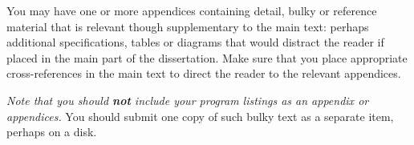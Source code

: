 You may have one or more appendices containing detail, bulky or reference 
material that is relevant though supplementary to the main text: perhaps 
additional specifications, tables or diagrams that would distract the reader if 
placed in the main part of the dissertation. Make sure that you place 
appropriate cross-references in the main text to direct the reader to the 
relevant appendices.

\textit{Note that you should \textbf{\large not} include your program listings 
as an appendix or appendices.} You should submit one copy of such bulky text as 
a separate item, perhaps on a disk.